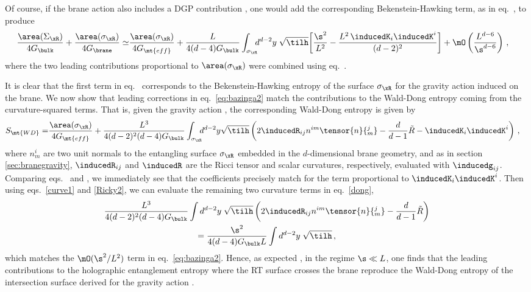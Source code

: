 Of course, if the brane action also includes a DGP contribution , one would add the corresponding Bekenstein-Hawking term, as in eq.~, to produce
\begin{align}
	\begin{split}
  \frac{\area(\Sigma_\xR)}{4 G_\bulk}+ \frac{\area(\sigma_\xR)}{4 G_\brane}
  \simeq&
  \frac{\area(\sigma_\xR)}{4G_\mt{eff}}+\frac{L}{4(d-4) G_\bulk}\int_{\sigma_\xR}\!\!\! d^{d-2}y\; \sqrt{\tilh}\bigg[ 
    \frac{\s^2}{L^2}
- \frac{L^2\,\inducedK_i \inducedK^i}{(d-2)^2}
	\bigg]
  + \mO\left(\frac{L^{d-6}}{ \s^{d-6}}\right)\,,
	\end{split}
  \label{eq:bazinga2}
\end{align}
where the two leading contributions proportional to $\area(\sigma_\xR)$ were combined using eq.~.


It is clear that the first term in eq.~ corresponds to the Bekenstein-Hawking entropy of the surface $\sigma_\xR$ for the gravity action  induced on the brane. 
We now show that leading corrections in eq.~\eqref{eq:bazinga2} match the contributions to the Wald-Dong entropy \cite{Dong:2013qoa} coming from the curvature-squared terms. That is, given the gravity action , the corresponding Wald-Dong entropy is given by
\begin{align}\label{dong}
	\begin{split}
S_\mt{WD} =& \frac{\area(\sigma_\xR)}{4G_\mt{eff}}+
\frac{L^3}{4(d-2)^2 (d-4)G_\bulk}\int_{\sigma_\xR}\!\!\! d^{d-2}y \sqrt{\tilh}
\left(2 \inducedR_{ij} n^{im} \tensor{n}{^j_m}
-\frac{d}{d-1} \tilde{R}-\inducedK_i \inducedK^i
\right)\,,
\end{split}
\end{align}
where $n^i_m$ are two unit normals to the entangling surface $\sigma_\xR$ embedded in the $d$-dimensional brane geometry, and as in section \ref{sec:branegravity}, $\inducedR_{ij}$ and $\inducedR$ are the Ricci tensor and scalar curvatures, respectively, evaluated with $\inducedg_{ij}$. Comparing eqs.~ and , we immediately see that the coefficients precisely match for the term proportional to $\inducedK_i \inducedK^i$.
Then using eqs.~\eqref{curve1} and \eqref{Ricky2}, we can evaluate the remaining two curvature terms in eq.~\eqref{dong},
\begin{multline}\label{gam}
	\frac{L^3}{4(d-2)^2(d-4)G_\bulk} \int d^{d-2}y\; \sqrt{\tilh}
  \left( 2\inducedR_{ij} n^{im} \tensor{n}{^j_m}
  -\frac{d}{d-1} \tilde{R}
  \right)
	\\
  = \frac{\s^2}{4(d-4)G_\bulk L} \int d^{d-2}y\; \sqrt{\tilh}\,,
\end{multline}
which matches the $\mO(\s^2/L^2)$ term in eq.~\eqref{eq:bazinga2}. Hence, as expected \cite{Emparan:2006ni,Myers:2013lva}, in the regime $\s\ll L$, one finds that the leading contributions to the holographic entanglement entropy   where the RT surface crosses the brane reproduce the Wald-Dong entropy of the intersection surface derived for the gravity action .


